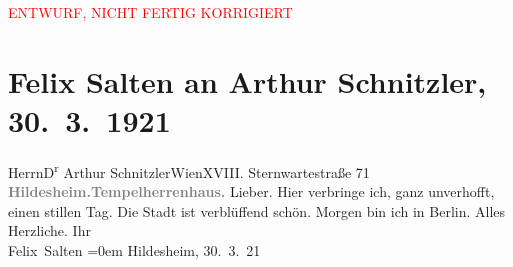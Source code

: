 
\begin{center}
            \textcolor{red}{ENTWURF, NICHT FERTIG KORRIGIERT}
                      \end{center}
            
         
         \renewcommand{\erwaehntePersonen}{Personen: Frieda Pollak}
         \renewcommand{\erwaehnteOrte}{Orte: Berlin, Hildesheim, Sternwartestraße, Tempelhaus (Hildesheim), Wien}
         \renewcommand{\erwaehnteWerke}{}
               \section[Felix Salten an Arthur Schnitzler, 30. 3. 1921]{ Felix Salten an Arthur Schnitzler, 30. 3. 1921}\nopagebreak{}\rehead{ }\begin{ledgroupsized}[t]{13cm}\normalsize\beginnumbering \toendnotes[C]{\smallbreak\pagebreak[2]} 
\pstart{}{\pb}Herrn\pend{}\pstart{}D\textsuperscript{r} Arthur Schnitzler\pend{}\pstart{}Wien\pend{}\pstart{}XVIII. Sternwartestraße 71\pend{}{\bigskip}\pstart
           \noindent{}{\pb}\textcolor{gray}{\textbf{Hildesheim.}}\textcolor{gray}{\textbf{Tempelherrenhaus.}}\pend
           \pstart
           {\pb}Lieber. Hier verbringe ich, ganz unverhofft, einen
               stillen Tag. Die Stadt ist verblüffend schön. Morgen bin ich in Berlin. \pend
           \pstart
           Alles Herzliche. Ihr {\\[\baselineskip]}\spacefill\mbox{Felix Salten}\pend
           \leftskip=0em{}\pstart
           Hildesheim, 30. 3. 21\pend
           
         
         \endnumbering{}\end{ledgroupsized}\begin{anhang}\end{anhang}\newcommand{\dateiname}{L03570}\newcommand{\titel}{Felix Salten an Arthur Schnitzler, 30. 3. 1921}\newcommand{\editorInnen}{Martin Anton Müller und Laura Untner}
      
